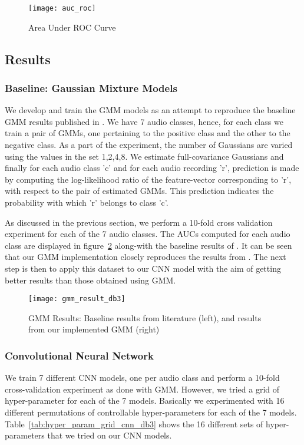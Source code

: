 \begin{figure}[!htb] 
\centering 
\texttt{[image: auc\_roc]}
\caption[Area Under ROC Curve]{Area Under ROC Curve}
\label{fig:auc_roc} 
\end{figure}


\subsection{Results}

\subsubsection{Baseline: Gaussian Mixture Models}
We develop and train the GMM models as an attempt to reproduce the baseline GMM results published in \cite{foster2015chime}. We have 7 audio classes, hence, for each class we train a pair of GMMs, one pertaining to the positive class and the other to the negative class. As  a part of the experiment, the number of Gaussians are varied using the values in the set {1,2,4,8}. We estimate full-covariance Gaussians and finally for each audio class 'c' and for each audio recording 'r', prediction is made by computing the log-likelihood ratio of the feature-vector corresponding to 'r', with respect to the pair of estimated GMMs. This prediction indicates the probability with which 'r' belongs to class 'c'.

As discussed in the previous section, we perform a 10-fold cross validation experiment for each of the 7 audio classes. The AUCs computed for each audio class are displayed in figure~\ref{fig:gmm_result_db3} along-with the baseline results of \cite{foster2015chime}. It can be seen that our GMM implementation closely reproduces the results from \cite{foster2015chime}. The next step is then to apply this dataset to our CNN model with the aim of getting better results than those obtained using GMM. 

\begin{figure}[!htb] 
\centering 
\texttt{[image: gmm\_result\_db3]}
\caption[GMM Results: Baseline results from literature (left), and results from our implemented GMM (right)]{GMM Results: Baseline results from literature (left), and results from our implemented GMM (right)}
\label{fig:gmm_result_db3} 
\end{figure}

\subsubsection{Convolutional Neural Network}
We train 7 different CNN models, one per audio class and perform a 10-fold cross-validation experiment as done with GMM. However, we tried a grid of hyper-parameter for each of the 7 models. Basically we experimented with 16 different permutations of controllable hyper-parameters for each of the 7 models. Table~\ref{tab:hyper_param_grid_cnn_db3} shows the 16 different sets of hyper-parameters that we tried on our CNN models.

